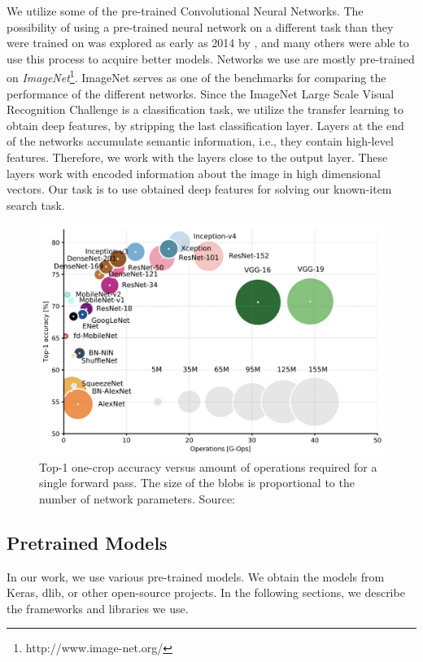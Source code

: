 We utilize some of the pre-trained Convolutional Neural Networks. The possibility of using a pre-trained neural network on a different task than they were trained on was explored as early as 2014 by \cite{donahuedeep}, and many others were able to use this process to acquire better models.  Networks we use are mostly pre-trained on \emph{ImageNet}\footnote{http://www.image-net.org/}. ImageNet serves as one of the benchmarks for comparing the performance of the different networks. Since the ImageNet Large Scale Visual Recognition Challenge \citep{ILSVRC15} is a classification task, we utilize the transfer learning to obtain deep features, by stripping the last classification layer. Layers at the end of the networks accumulate semantic information, i.e., they contain high-level features. Therefore, we work with the layers close to the output layer. These layers work with encoded information about the image in high dimensional vectors. Our task is to use obtained deep features for solving our known-item search task.

\begin{figure}
    \centering
	\includegraphics[width=0.8\linewidth]{img/network-comparison.jpeg}
	\caption[Top-1 one-crop accuracy versus amount of operations required for a single forward pass]{Top-1 one-crop accuracy versus amount of operations required for a single forward pass. The size of the blobs is proportional to the number of network parameters. Source: \cite{canziani2016analysis}}
	\label{fig:camera-setup}
\end{figure}

\subsection{Pretrained Models}
\label{ss:pretrained_models}

In our work, we use various pre-trained models. We obtain the models from Keras, dlib, or other open-source projects. In the following sections, we describe the frameworks and libraries we use.

